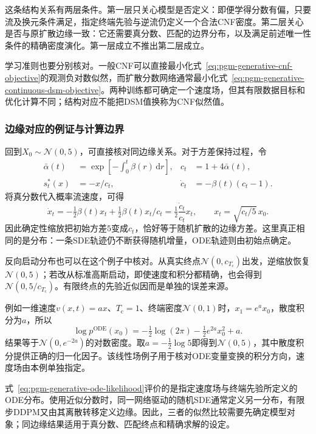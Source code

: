 这条结构关系有两层条件。第一层只关心模型是否定义：即便学得分数有偏，只要流及换元条件满足，指定终端先验与逆流仍定义一个合法CNF密度。第二层关心是否与原扩散边缘一致：它还需要真分数、匹配的边界分布，以及满足前述唯一性条件的精确密度演化。第一层成立不推出第二层成立。

学习准则也要分别核对。一般CNF可以直接最小化式~\eqref{eq:pgm-generative-cnf-objective}的观测负对数似然，而扩散分数网络通常最小化式~\eqref{eq:pgm-generative-continuous-dsm-objective}。两种训练都可确定一个速度场，但其有限数据目标和优化计算不同；结构对应不能把DSM值换称为CNF似然值。

\subsubsection{边缘对应的例证与计算边界}
\label{sec:pgm-generative-flow-boundaries}

回到$X_0\sim\mathcal N(0,5)$，可直接核对同边缘关系。对于方差保持过程，令
\begin{equation}
  \label{eq:pgm-generative-vp-gaussian-flow}
  \begin{aligned}
    \bar\alpha(t)&=\exp\left[-\int_0^t\beta(r)\,\mathrm dr\right],
       &c_t&=1+4\bar\alpha(t),\\
    s_t^*(x)&=-x/c_t,
       &\dot c_t&=-\beta(t)(c_t-1).
  \end{aligned}
\end{equation}
将真分数代入概率流速度，可得
\[
  \dot x_t=-\tfrac12\beta(t)x_t+
                    \tfrac12\beta(t)x_t/c_t
           =\tfrac12\frac{\dot c_t}{c_t}x_t,
  \qquad x_t=\sqrt{c_t/5}\,x_0.
\]
因此确定性缩放把初始方差$5$变成$c_t$，恰好等于随机扩散的边缘方差。这里真正相同的是分布：一条SDE轨迹仍不断获得随机增量，ODE轨迹则由初始点确定。

反向启动分布也可以在这个例子中核对。从真实终点$\mathcal N(0,c_{T_{\mathrm c}})$出发，逆缩放恢复$\mathcal N(0,5)$；若改从标准高斯启动，即使速度和积分都精确，也会得到$\mathcal N(0,5/c_{T_{\mathrm c}})$。有限终点的先验近似因而是单独的误差来源。

例如一维速度$v(x,t)=ax$、$T_{\mathrm{c}}=1$、终端密度$\mathcal{N}(0,1)$时，$x_1=e^a x_0$，散度积分为$a$，所以
\[
  \log p^{\mathrm{ODE}}(x_0)
  =-\tfrac12\log(2\pi)-\tfrac12e^{2a}x_0^2+a.
\]
结果等于$\mathcal{N}(0,e^{-2a})$的对数密度。取$a=-\tfrac12\log5$即得到$\mathcal{N}(0,5)$，其中散度积分提供正确的归一化因子。该线性场例子用于核对ODE变量变换的积分方向，速度场由本例单独指定。

式~\eqref{eq:pgm-generative-ode-likelihood}评价的是指定速度场与终端先验所定义的ODE分布。使用近似分数时，同一网络驱动的随机SDE通常定义另一分布，有限步DDPM又由其离散转移定义边缘。因此，三者的似然比较需要先确定模型对象；同边缘结果适用于真分数、匹配终点和精确求解的设定。

